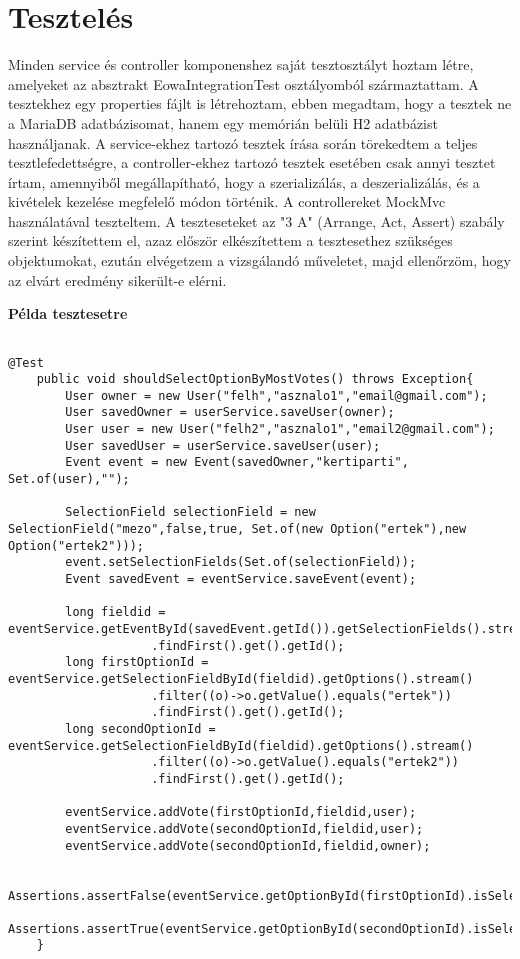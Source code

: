 \documentclass[a4paper,12pt]{report}
\theoremstyle{definition}
\theoremstyle{remark}
\begin{document}
\section{Tesztelés}

Minden service és controller komponenshez saját tesztosztályt hoztam létre, amelyeket az absztrakt EowaIntegrationTest osztályomból származtattam.  A tesztekhez egy properties fájlt is létrehoztam, ebben megadtam, hogy a tesztek ne a MariaDB adatbázisomat, hanem egy memórián belüli H2 adatbázist használjanak. A service-ekhez tartozó tesztek írása során törekedtem a teljes tesztlefedettségre, a controller-ekhez tartozó tesztek esetében csak annyi tesztet írtam, amennyiből megállapítható, hogy a szerializálás, a deszerializálás, és a kivételek kezelése megfelelő módon történik. A controllereket MockMvc használatával teszteltem. A teszteseteket az "3 A" (Arrange, Act, Assert) szabály szerint készítettem el, azaz először elkészítettem a tesztesethez szükséges objektumokat, ezután elvégetzem a vizsgálandó műveletet, majd ellenőrzöm, hogy az elvárt eredmény sikerült-e elérni.

\newpage
{\Huge \bf Példa tesztesetre}
\begin{lstlisting}

@Test
    public void shouldSelectOptionByMostVotes() throws Exception{
        User owner = new User("felh","asznalo1","email@gmail.com");
        User savedOwner = userService.saveUser(owner);
        User user = new User("felh2","asznalo1","email2@gmail.com");
        User savedUser = userService.saveUser(user);
        Event event = new Event(savedOwner,"kertiparti", Set.of(user),"");

        SelectionField selectionField = new SelectionField("mezo",false,true, Set.of(new Option("ertek"),new Option("ertek2")));
        event.setSelectionFields(Set.of(selectionField));
        Event savedEvent = eventService.saveEvent(event);

        long fieldid = eventService.getEventById(savedEvent.getId()).getSelectionFields().stream()
					.findFirst().get().getId();
        long firstOptionId = eventService.getSelectionFieldById(fieldid).getOptions().stream()
					.filter((o)->o.getValue().equals("ertek"))
					.findFirst().get().getId();
        long secondOptionId = eventService.getSelectionFieldById(fieldid).getOptions().stream()
					.filter((o)->o.getValue().equals("ertek2"))
					.findFirst().get().getId();

        eventService.addVote(firstOptionId,fieldid,user);
        eventService.addVote(secondOptionId,fieldid,user);
        eventService.addVote(secondOptionId,fieldid,owner);

        Assertions.assertFalse(eventService.getOptionById(firstOptionId).isSelected());
        Assertions.assertTrue(eventService.getOptionById(secondOptionId).isSelected());
    }

\end{lstlisting}
\end{document}
